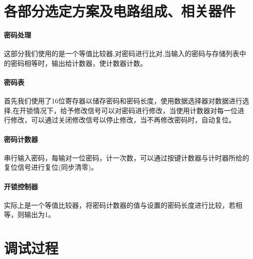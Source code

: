 \documentclass[a4paper,11pt]{ctexart}
\begin{document}
\section{各部分选定方案及电路组成、相关器件}
\paragraph{密码处理}这部分我们使用的是一个等值比较器,对密码进行比对,当输入的密码与存储列表中的密码相等时，输出给计数器，使计数器计数。
\paragraph{密码表}首先我们使用了16位寄存器以储存密码和密码长度，使用数据选择器对数据进行选择,在开锁情况下，给予修改信号可以对密码进行修改，当使用计数器对每一位进行修改，可以通过关闭修改信号以停止修改，当不再修改密码时，自动复位。
\paragraph{密码计数器}串行输入密码，每输对一位密码，计一次数，可以通过按键计数器与计时器所给的复位信号进行复位(同步清零)。
\paragraph{开锁控制器}实际上是一个等值比较器，将密码计数器的值与设置的密码长度进行比较，若相等，则输出为1。
\section{调试过程}
\end{document}
